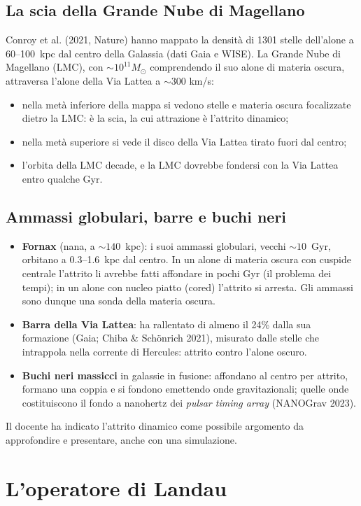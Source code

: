 \subsection{La scia della Grande Nube di Magellano}
Conroy et al. (2021, Nature) hanno mappato la densità di 1301 stelle dell'alone a 60--100~kpc dal centro della Galassia (dati Gaia e WISE). La Grande Nube di Magellano (LMC), con $\sim10^{11}M_\odot$ comprendendo il suo alone di materia oscura, attraversa l'alone della Via Lattea a $\sim300$ km/s:
\begin{itemize}
\item nella metà inferiore della mappa si vedono stelle e materia oscura focalizzate dietro la LMC: è la scia, la cui attrazione è l'attrito dinamico;
\item nella metà superiore si vede il disco della Via Lattea tirato fuori dal centro;
\item l'orbita della LMC decade, e la LMC dovrebbe fondersi con la Via Lattea entro qualche Gyr.
\end{itemize}

\subsection{Ammassi globulari, barre e buchi neri}
\begin{itemize}
\item \textbf{Fornax} (nana, a $\sim140$~kpc): i suoi ammassi globulari, vecchi $\sim10$~Gyr, orbitano a 0.3--1.6~kpc dal centro. In un alone di materia oscura con cuspide centrale l'attrito li avrebbe fatti affondare in pochi Gyr (il problema dei tempi); in un alone con nucleo piatto (cored) l'attrito si arresta. Gli ammassi sono dunque una sonda della materia oscura.
\item \textbf{Barra della Via Lattea}: ha rallentato di almeno il 24\% dalla sua formazione (Gaia; Chiba \& Sch\"onrich 2021), misurato dalle stelle che intrappola nella corrente di Hercules: attrito contro l'alone oscuro.
\item \textbf{Buchi neri massicci} in galassie in fusione: affondano al centro per attrito, formano una coppia e si fondono emettendo onde gravitazionali; quelle onde costituiscono il fondo a nanohertz dei \textit{pulsar timing array} (NANOGrav 2023).
\end{itemize}
Il docente ha indicato l'attrito dinamico come possibile argomento da approfondire e presentare, anche con una simulazione.

\section{L'operatore di Landau}
